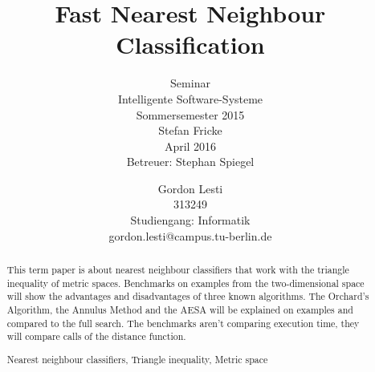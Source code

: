 \documentclass[runningheads,a4paper]{llncs}
\newcommand{\keywords}[1]{\par\addvspace\baselineskip
\noindent\keywordname\enspace\ignorespaces#1}
\begin{document}
\mainmatter

\title{Fast Nearest Neighbour Classification}
\subtitle{\textnormal{\small{Seminar\\
Intelligente Software-Systeme\\
Sommersemester 2015\\\vspace{1\baselineskip}
Stefan Fricke\\\vspace{2\baselineskip}
April 2016\\
Betreuer: Stephan Spiegel\\\vspace{1\baselineskip}}}}


\author{Gordon Lesti\\313249\\Studiengang: Informatik\\gordon.lesti@campus.tu-berlin.de\\\vspace{5\baselineskip}}



\maketitle
{}

\begin{abstract}
This term paper is about nearest neighbour classifiers that work with the triangle inequality of metric spaces.
Benchmarks on examples from the two-dimensional space will show the advantages and disadvantages of three known
algorithms. The Orchard’s Algorithm, the Annulus Method and the AESA will be explained on examples and compared to the
full search. The benchmarks aren't comparing execution time, they will compare calls of the distance function.
\keywords{Nearest neighbour classifiers, Triangle inequality, Metric space}
\end{abstract}
\end{document}
